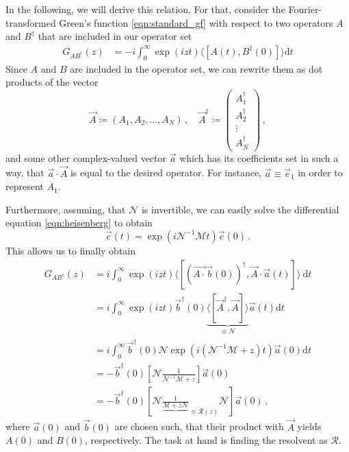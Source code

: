 \documentclass[
    reprint, 
    aps,
    preprintnumbers,
    twocolumn,
    prb,
    superscriptaddress
]{revtex4-2}
\newcommand{\mM}{\mathcal{M}}
\newcommand{\mN}{\mathcal{N}}
\begin{document}
In the following, we will derive this relation.
For that, consider the Fourier-transformed Green's function \eqref{eqn:standard_gf} with respect to two operators $A$ and $B^\dagger$ that are included in our operator set
\begin{align}
    G_{AB^\dagger} (z) &= - i \int_0^\infty \exp(i z t) \langle [ A(t), B^\dagger(0) ] \rangle \mathrm{d}t
\end{align}
Since $A$ and $B$ are included in the operator set, we can rewrite them as dot products of the vector
\begin{equation}
    \vec{A} \coloneqq  \left( A_1, A_2, \dots, A_N \right)\,, \quad
    \vec{A}^\dagger \coloneqq  \begin{pmatrix}
        A_1^\dagger \\ A_2^\dagger \\ \vdots \\ A_N^\dagger
    \end{pmatrix}\,,
\end{equation}
and some other complex-valued vector $\vec{a}$ which has its coefficients set in such a way,
that $\vec{a} \cdot \vec{A}$ is equal to the desired operator. 
For instance, $\vec{a} \equiv \vec{e}_1$ in order to represent $A_1$.

Furthermore, assuming, that $\mN$ is invertible, we can easily solve the differential equation \eqref{eqn:heisenberg} to obtain
\begin{equation}
    \vec{c}(t) = \exp \left( i \mN^{-1} \mM t \right) \vec{c}(0)\,.
\end{equation}
This allows us to finally obtain
\begin{align}
    \label{eqn:green_derivation}
    G_{AB^\dagger} (z) &= i \int_0^\infty \exp(izt) \langle [ (\vec{A \cdot} \vec{b}(0))^\dagger, \vec{A} \cdot \vec{a}(t) ] \rangle\ \mathrm{d}t \nonumber \\
        &= i \int_0^\infty \exp(izt) \vec{b}^\dagger(0) \underbrace{\langle [ \vec{A}^\dagger, \vec{A} ] \rangle}_{\equiv \mN} \vec{a}(t) \mathrm{d}t \nonumber \\
        &= i  \int_0^\infty \vec{b}^\dagger(0) \mN \exp \left( i \left(\mN^{-1} \mM + z \right) t \right) \vec{a}(0) \mathrm{d}t  \nonumber \\
        &= - \vec{b}^\dagger(0) \left[ \mN \frac{1}{\mN^{-1} \mM + z} \right] \vec{a}(0) \nonumber \\
        &= - \vec{b}^\dagger(0) \left[ \mN \frac{1}{ \underbrace{\mM + z \mN}}_{\equiv \mathcal{R}(z)} \mN \right] \vec{a}(0)\,,
\end{align}
where $\vec{a}(0)$ and $\vec{b}(0)$ are chosen such, that their product with $\vec{A}$ yields $A(0)$ and $B(0)$, respectively.
The task at hand is finding the resolvent as $\mathcal{R}$.
\end{document}
